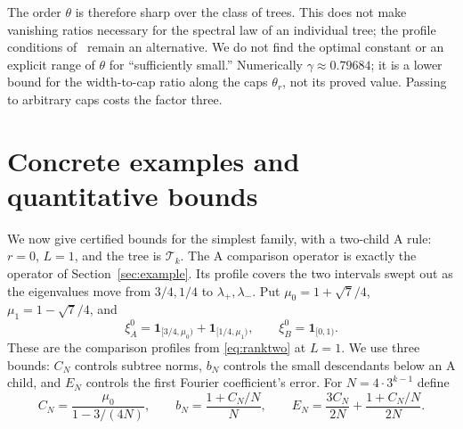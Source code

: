 \documentclass[11pt]{article}
\theoremstyle{definition}
\theoremstyle{remark}
\newcommand{\one}{\mathbf 1}
\newcommand{\cyl}{\mathcal T}
\begin{document}
The order $\theta$ is therefore sharp over the class of trees. This
does not make vanishing ratios necessary for the spectral law of an
individual tree; the profile conditions of~\cite{K26} remain an
alternative. We do not find the optimal constant or an explicit range
of $\theta$ for ``sufficiently small.'' Numerically $\gamma\approx0.79684$;
it is a lower bound for the width-to-cap ratio along the caps
$\theta_r$, not its proved value. Passing to arbitrary caps costs the
factor three.

\section{Concrete examples and quantitative bounds}\label{sec:profiles}

We now give certified bounds for the simplest family, with a two-child
A rule: $r=0$, $L=1$, and the tree is $\cyl_k$. The A comparison
operator is exactly the operator of Section~\ref{sec:example}. Its
profile covers the two intervals swept out as the eigenvalues move from
$3/4,1/4$ to $\lambda_+,\lambda_-$.
Put $\mu_0=1+\sqrt7/4$, $\mu_1=1-\sqrt7/4$, and
\[
 \xi_A^0=\one_{[3/4,\mu_0)}+\one_{[1/4,\mu_1)},\qquad
 \xi_B^0=\one_{[0,1)}.
\]
These are the comparison profiles from \eqref{eq:ranktwo} at $L=1$.
We use three bounds: $C_N$ controls subtree norms, $b_N$ controls the
small descendants below an A child, and $E_N$ controls the first
Fourier coefficient's error. For $N=4\cdot3^{k-1}$ define
\begin{equation}\label{eq:sharpconstants}
 C_N=\frac{\mu_0}{1-3/(4N)},\qquad
 b_N=\frac{1+C_N/N}{N},\qquad
 E_N=\frac{3C_N}{2N}+\frac{1+C_N/N}{2N}.
\end{equation}
\end{document}
